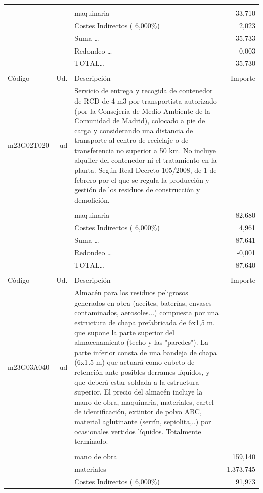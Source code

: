 \begin{supertabular}{l r p{60mm} r}
&&&\\%
&&maquinaria&    33,710\\%
&&Costes Indirectos (     6,000\%)&     2,023\\%
&&Suma \ldots&    35,733\\%
&&Redondeo \ldots&    {-}0,003\\%
%
&&TOTAL\ldots&    35,730\\%
&&&\\%
Código&Ud.&Descripción&Importe\\%
\hline%
m23G02T020&ud&Servicio de entrega y recogida de contenedor de RCD de 4 m3 por transportista autorizado (por la Consejería de Medio Ambiente de la Comunidad de Madrid), colocado a pie de carga y considerando una distancia de transporte al centro de reciclaje o de transferencia no superior a 50 km. No incluye alquiler del contenedor ni el tratamiento en la planta. Según Real Decreto 105/2008, de 1 de febrero por el que se regula la producción y gestión de los residuos de construcción y demolición.&\\%
&&&\\%
&&maquinaria&    82,680\\%
&&Costes Indirectos (     6,000\%)&     4,961\\%
&&Suma \ldots&    87,641\\%
&&Redondeo \ldots&    {-}0,001\\%
%
&&TOTAL\ldots&    87,640\\%
&&&\\%
Código&Ud.&Descripción&Importe\\%
\hline%
m23G03A040&ud&Almacén para los residuos peligrosos generados en obra (aceites, baterías, envases contaminados, aerosoles...) compuesta por una estructura de chapa prefabricada de 6x1,5 m. que supone la parte superior del almacenamiento (techo y las "paredes"). La parte inferior consta de una bandeja de chapa (6x1.5 m) que actuará como cubeto de retención ante posibles derrames líquidos, y que deberá estar soldada a la estructura superior. El precio del almacén incluye la mano de obra, maquinaria, materiales, cartel de identificación, extintor de polvo ABC, material aglutinante (serrín, sepiolita,..) por ocasionales vertidos líquidos. Totalmente terminado.&\\%
&&&\\%
&&mano de obra&   159,140\\%
&&materiales& 1.373,745\\%
&&Costes Indirectos (     6,000\%)&    91,973\\%

\end{supertabular}
